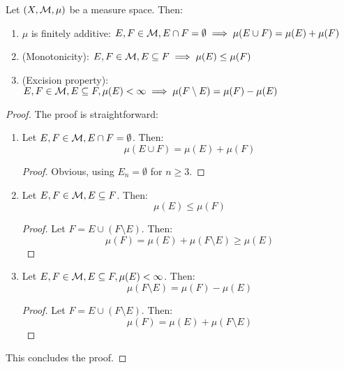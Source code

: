 \begin{ftheorem}
    Let $(X, \mathcal{M}, \mu)$ be a measure space. Then:
    \vspace{1em}
    \begin{enumerate}[label=(\roman*)]
        \item $\mu$ is finitely additive: $E, F \in \mathcal{M}, E \cap F = \emptyset \implies \mu(E \cup F) = \mu(E) + \mu(F)$
        \vspace{1em}
        \item (Monotonicity): $E, F \in \mathcal{M}, E \subseteq F \implies \mu(E) \leq \mu(F)$
        \vspace{1em}
        \item (Excision property): $E, F \in \mathcal{M}, E \subseteq F, \mu(E) < \infty \implies \mu(F \setminus E) = \mu(F) - \mu(E)$
    \end{enumerate}
\end{ftheorem}

\begin{proof}
    The proof is straightforward:
    \begin{enumerate}[label=(\roman*)]
        \item Let $E, F \in \mathcal{M}, E \cap F = \emptyset$. Then:
        $$\mu(E \cup F) = \mu(E) + \mu(F)$$
        \begin{proof}
            Obvious, using $E_n = \emptyset$ for $n \geq 3$.
        \end{proof}
        \item Let $E, F \in \mathcal{M}, E \subseteq F$. Then:
        $$\mu(E) \leq \mu(F)$$
        \begin{proof}
            Let $F = E \cup (F \setminus E)$. Then:
            $$\mu(F) = \mu(E) + \mu(F \setminus E) \geq \mu(E)$$
        \end{proof}
        \item Let $E, F \in \mathcal{M}, E \subseteq F, \mu(E) < \infty$. Then:
        $$\mu(F \setminus E) = \mu(F) - \mu(E)$$
        \begin{proof}
            Let $F = E \cup (F \setminus E)$. Then:
            $$\mu(F) = \mu(E) + \mu(F \setminus E)$$
        \end{proof}
    \end{enumerate}

    This concludes the proof.

\end{proof}

